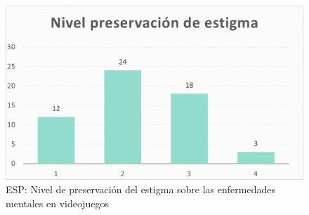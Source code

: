 \documentclass[12pt, a4paper,twoside,titlepage]{book}
\begin{document}
\begin{figure}
    \centering
    \includegraphics[width=.8\linewidth]{ANEXO ESP/15AnexESPEst}
    \caption{ESP: Nivel de preservación del estigma sobre las enfermedades mentales en videojuegos}
    \label{fig:ESPEstigma}
\end{figure}
\end{document}
